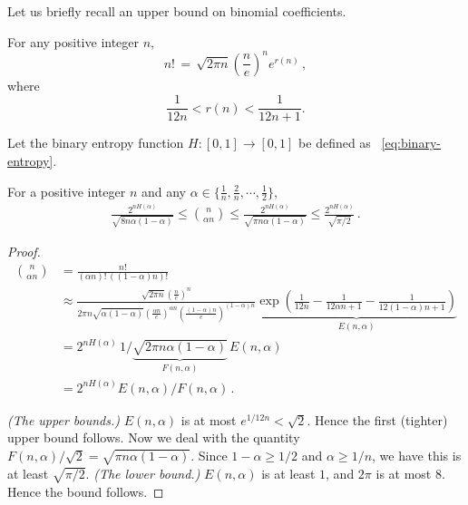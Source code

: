 Let us briefly recall an upper bound on binomial coefficients.

\begin{theorem}
For any positive integer $n$,
\[
n! \, = \, \sqrt{2\pi n}(\frac{n}{e})^n e^{r(n)}\, ,
\]where
\[
\frac{1}{12n} < r(n) < \frac{1}{12n + 1}.
\]
\end{theorem}

Let the binary entropy function $H : [0, 1] \rightarrow [0, 1]$ be defined as ~\eqref{eq:binary-entropy}.

\begin{corollary}\label{coro:nchoosek_1}
For a positive integer $n$ and any $\alpha \in \{\frac{1}{n}, \frac{2}{n}, \cdots, \frac{1}{2} \}$, 
\begin{align}\label{eq:nck}
  \frac{2^{n H(\alpha)}}{\sqrt{8 n\alpha (1-\alpha)}} 
  \leq {n \choose \alpha n} 
  \leq \frac{2^{n H(\alpha)}}{\sqrt{\pi n\alpha (1-\alpha)}} 
  \leq \frac{2^{n H(\alpha)}}{\sqrt{\pi/2}} \, .
\end{align}
\end{corollary}

\begin{proof}
\begin{align*}
{n \choose \alpha n}
&= \frac{n!}{(\alpha n)!\, \left( (1-\alpha)n \right)! }\\
&\approx \frac{\sqrt{2\pi n}(\frac{n}{e})^n}{2\pi n\sqrt{\alpha (1-\alpha)}(\frac{\alpha n}{e})^{\alpha n}(\frac{(1-\alpha)n}{e})^{(1-\alpha)n} } \underbrace{ \exp\left( \frac{1}{12n} - \frac{1}{12\alpha n + 1} - \frac{1}{12(1-\alpha)n+1}\right) }_{ E(n,\alpha) } \\
&= 2^{n H(\alpha)} \, 1/\underbrace{ \sqrt{2 \pi n\alpha (1-\alpha)} }_{F(n, \alpha)} \, E(n, \alpha) \\
&=2^{n H(\alpha)} E(n, \alpha)/F(n, \alpha) \, .
\end{align*}

\emph{(The upper bounds.)} $E(n,\alpha)$ is at most $e^{1/12 n} < \sqrt{2}$. Hence the first (tighter) upper bound follows. Now we deal with the quantity $F(n, \alpha)/\sqrt{2} = \sqrt{\pi n \alpha (1-\alpha)}$. Since $1-\alpha \geq 1/2$ and $\alpha \geq 1/n$, we have this is at least $ \sqrt{\pi/2}$. \emph{(The lower bound.)} $E(n, \alpha)$ is at least $1$, and $2\pi$ is at most $8$. Hence the bound follows.

\end{proof}

